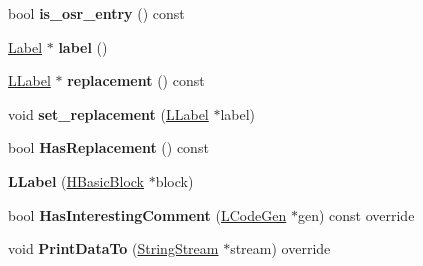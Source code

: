 \begin{DoxyCompactItemize}
\item 
bool {\bfseries is\+\_\+osr\+\_\+entry} () const \hypertarget{classv8_1_1internal_1_1_l_label_a2a98f2b24dada94a6a1e4f78b0cb88be}{}\label{classv8_1_1internal_1_1_l_label_a2a98f2b24dada94a6a1e4f78b0cb88be}

\item 
\hyperlink{classv8_1_1internal_1_1_label}{Label} $\ast$ {\bfseries label} ()\hypertarget{classv8_1_1internal_1_1_l_label_aad0d2d6e266d7d6ee11d0d4d2e4342c8}{}\label{classv8_1_1internal_1_1_l_label_aad0d2d6e266d7d6ee11d0d4d2e4342c8}

\item 
\hyperlink{classv8_1_1internal_1_1_l_label}{L\+Label} $\ast$ {\bfseries replacement} () const \hypertarget{classv8_1_1internal_1_1_l_label_aeae2ce751911693b33505ace069c9f38}{}\label{classv8_1_1internal_1_1_l_label_aeae2ce751911693b33505ace069c9f38}

\item 
void {\bfseries set\+\_\+replacement} (\hyperlink{classv8_1_1internal_1_1_l_label}{L\+Label} $\ast$label)\hypertarget{classv8_1_1internal_1_1_l_label_a05875ed6601582974b107974f2720dc6}{}\label{classv8_1_1internal_1_1_l_label_a05875ed6601582974b107974f2720dc6}

\item 
bool {\bfseries Has\+Replacement} () const \hypertarget{classv8_1_1internal_1_1_l_label_a3215ec5382dd576d965f7ff0e18a7b0e}{}\label{classv8_1_1internal_1_1_l_label_a3215ec5382dd576d965f7ff0e18a7b0e}

\item 
{\bfseries L\+Label} (\hyperlink{classv8_1_1internal_1_1_h_basic_block}{H\+Basic\+Block} $\ast$block)\hypertarget{classv8_1_1internal_1_1_l_label_aa8ea13a89f3934f66742778ba3f83cd4}{}\label{classv8_1_1internal_1_1_l_label_aa8ea13a89f3934f66742778ba3f83cd4}

\item 
bool {\bfseries Has\+Interesting\+Comment} (\hyperlink{classv8_1_1internal_1_1_l_code_gen}{L\+Code\+Gen} $\ast$gen) const  override\hypertarget{classv8_1_1internal_1_1_l_label_aa0a8236af4aaa8c0433e5082df86d31a}{}\label{classv8_1_1internal_1_1_l_label_aa0a8236af4aaa8c0433e5082df86d31a}

\item 
void {\bfseries Print\+Data\+To} (\hyperlink{classv8_1_1internal_1_1_string_stream}{String\+Stream} $\ast$stream) override\hypertarget{classv8_1_1internal_1_1_l_label_ac1318b8f414140c11ee85e3acd00491f}{}\label{classv8_1_1internal_1_1_l_label_ac1318b8f414140c11ee85e3acd00491f}


\end{DoxyCompactItemize}
